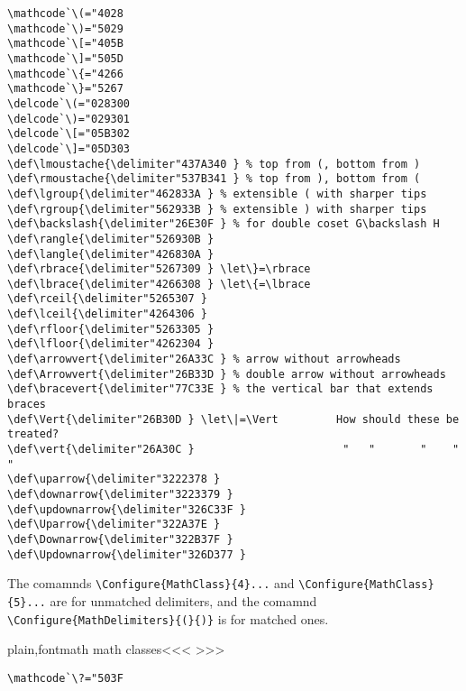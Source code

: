 {{\begin{verbatim}
\mathcode`\(="4028
\mathcode`\)="5029
\mathcode`\[="405B
\mathcode`\]="505D
\mathcode`\{="4266
\mathcode`\}="5267
\delcode`\(="028300
\delcode`\)="029301
\delcode`\[="05B302
\delcode`\]="05D303
\def\lmoustache{\delimiter"437A340 } % top from (, bottom from )
\def\rmoustache{\delimiter"537B341 } % top from ), bottom from (
\def\lgroup{\delimiter"462833A } % extensible ( with sharper tips
\def\rgroup{\delimiter"562933B } % extensible ) with sharper tips
\def\backslash{\delimiter"26E30F } % for double coset G\backslash H
\def\rangle{\delimiter"526930B }
\def\langle{\delimiter"426830A }
\def\rbrace{\delimiter"5267309 } \let\}=\rbrace
\def\lbrace{\delimiter"4266308 } \let\{=\lbrace
\def\rceil{\delimiter"5265307 }
\def\lceil{\delimiter"4264306 }
\def\rfloor{\delimiter"5263305 }
\def\lfloor{\delimiter"4262304 }
\def\arrowvert{\delimiter"26A33C } % arrow without arrowheads
\def\Arrowvert{\delimiter"26B33D } % double arrow without arrowheads
\def\bracevert{\delimiter"77C33E } % the vertical bar that extends braces
\def\Vert{\delimiter"26B30D } \let\|=\Vert         How should these be treated?
\def\vert{\delimiter"26A30C }                       "   "       "    "   "
\def\uparrow{\delimiter"3222378 }
\def\downarrow{\delimiter"3223379 }
\def\updownarrow{\delimiter"326C33F }
\def\Uparrow{\delimiter"322A37E }
\def\Downarrow{\delimiter"322B37F }
\def\Updownarrow{\delimiter"326D377 }
\end{verbatim}

The comamnds \verb'\Configure{MathClass}{4}...'
and \verb'\Configure{MathClass}{5}...'
are for unmatched delimiters, and the comamnd
\verb'\Configure{MathDelimiters}{(}{)}' is for matched ones.


\<plain,fontmath math classes\><<<
>>>

\begin{verbatim}
\mathcode`\?="503F
\end{verbatim}


}}
